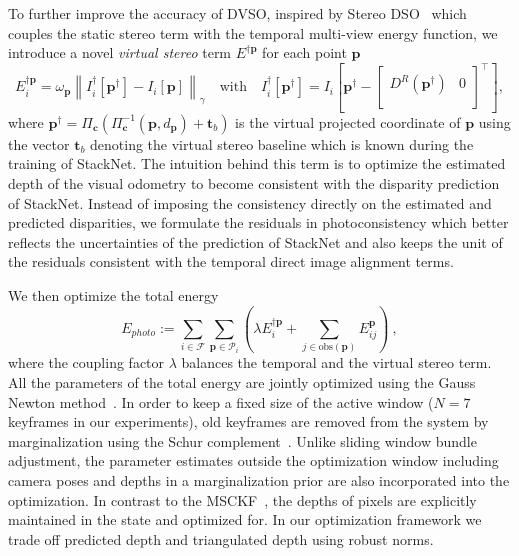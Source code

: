 \documentclass[runningheads]{llncs}
\begin{document}
To further improve the accuracy of DVSO, inspired by Stereo 
DSO~\cite{wang2017stereoDSO} which couples the static stereo 
term with the temporal multi-view energy function, we introduce a novel 
\emph{virtual stereo} term $E^{\dagger \mathbf{p}}$ for each point $\mathbf{p}$\begin{equation}
		E_{i}^{\dagger\mathbf{p}} = \omega_{\mathbf{p}} 
	\left\| I_i^\dagger\left[\mathbf{p}^\dagger\right] - I_i\left[\mathbf{p}\right] \right\|_\gamma 
	\quad 
	\text{with} \quad I_i^\dagger\left[\mathbf{p}^\dagger\right] = I_i\left[\mathbf{p}^\dagger 
	- 
	\begin{bmatrix}
	D^{R}\left(\mathbf{p}^\dagger\right) & 0 \\
	\end{bmatrix}^\top\right],
	\label{eq:5.8}
\end{equation}
where $\mathbf{p}^\dagger = \Pi_\mathbf{c}(\Pi_\mathbf{c}^{-1}(\mathbf{p}, 
d_{\mathbf{p}}) + \mathbf{t}_b)$ is the virtual projected coordinate of 
$\mathbf{p}$ using the  
vector $\mathbf{t}_b$ denoting the virtual stereo baseline which is known 
during the training of StackNet. 
The intuition behind this term is to optimize the estimated depth of the visual odometry to become consistent with the disparity prediction of StackNet.
Instead of imposing the consistency directly on the estimated and predicted disparities, we formulate the residuals in photoconsistency which better reflects the uncertainties of the prediction of StackNet and also keeps the unit of the residuals consistent with the temporal direct image alignment terms.

We then optimize the total energy 
\begin{equation}
E_{photo} := \sum_{i\in\mathcal{F}}\sum_{\mathbf{p} \in 
	\mathcal{P}_i} \left( \lambda E_{i}^{\dagger\mathbf{p}} + \sum_{j \in 
	\text{obs}(\mathbf{p})}E_{ij}^{\mathbf{p}} \right) \ ,
\label{eq:total_func}
\end{equation}
where the coupling factor $\lambda$ balances the temporal and the 
virtual stereo term. All the parameters of the total energy are 
jointly optimized using the Gauss Newton method~\cite{engel2017direct}. In order to 
keep a fixed size of the active window ($N=7$ keyframes in our experiments), 
old keyframes are removed from the 
system by marginalization using the Schur complement~\cite{engel2017direct}. 
Unlike sliding window bundle adjustment, the parameter estimates 
outside the optimization window including camera poses and depths in a 
marginalization prior are also incorporated into the optimization. In contrast 
to the MSCKF~\cite{msckf}, the depths of pixels are explicitly maintained in 
the state and 
optimized for. In our optimization framework we trade off predicted depth and 
triangulated depth using robust norms.
\end{document}
